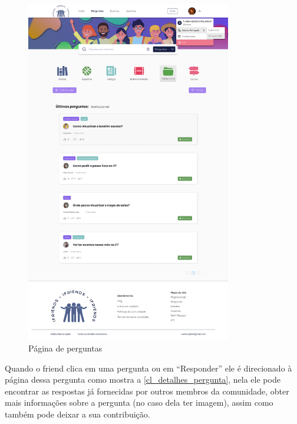 \begin{figure}[htb]
\centering
\caption{\label{cl_perguntas} Página de perguntas}
\includegraphics[width=0.8\textwidth]{anexos/Imagens_Prototipo/com_login/perguntas.png}
\end{figure}
\FloatBarrier

Quando o \gls{friend} clica em uma pergunta ou em ``Responder'' ele é direcionado à página dessa pergunta como mostra a \autoref{cl_detalhes_pergunta}, nela ele pode encontrar as respostas já fornecidas por outros membros da comunidade, obter mais informações sobre a pergunta (no caso dela ter imagem), assim como também pode deixar a sua contribuição.

